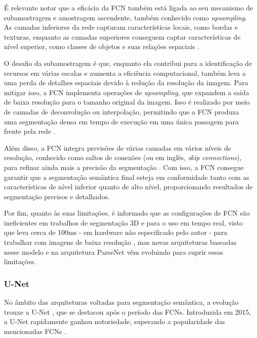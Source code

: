 É relevante notar que a eficácia da FCN também está ligada ao seu mecanismo de subamostragem e amostragem ascendente, também conhecido como \textit{upsampling}. As camadas inferiores da rede capturam características locais, como bordas e texturas, enquanto as camadas superiores conseguem captar características de nível superior, como classes de objetos e suas relações espaciais \citep{Shelhamer2016}.

O desafio da subamostragem é que, enquanto ela contribui para a identificação de recursos em várias escalas e aumenta a eficiência computacional, também leva a uma perda de detalhes espaciais devido à redução da resolução da imagem. Para mitigar isso, a FCN implementa operações de \textit{upsampling}, que expandem a saída de baixa resolução para o tamanho original da imagem. Isso é realizado por meio de camadas de deconvolução ou interpolação, permitindo que a FCN produza uma segmentação densa em tempo de execução em uma única passagem para frente pela rede \citep{Shelhamer2016}.

Além disso, a FCN integra previsões de várias camadas em vários níveis de resolução, conhecido como saltos de conexões (ou em inglês, \textit{skip connections}), para refinar ainda mais a precisão da segmentação \citep{Minaee2021}. Com isso, a FCN consegue garantir que a segmentação semântica final esteja em conformidade tanto com as características de nível inferior quanto de alto nível, proporcionando resultados de segmentação precisos e detalhados.

Por fim, quanto às suas limitações, é informado que as configurações de FCN são ineficientes em trabalhos de segmentação 3D e para o uso em tempo real, visto que leva cerca de 100ms - em hardware não especificado pelo autor - para trabalhar com imagens de baixa resolução \citep{Minaee2021}, mas novas arquiteturas baseadas nesse modelo e na arquitetura ParseNet \citep{Liu2015} vêm evoluindo para suprir essas limitações.

\subsubsection{U-Net}
\label{semantic:unet}
No âmbito das arquiteturas voltadas para segmentação semântica, a evolução trouxe a U-Net \citep{Ronneberger2015U-net:Segmentation}, que se destacou após o período das FCNs. Introduzida em 2015, a U-Net rapidamente ganhou notoriedade, superando a popularidade das mencionadas FCNs \citep{Sultana2020EvolutionSurvey}.

